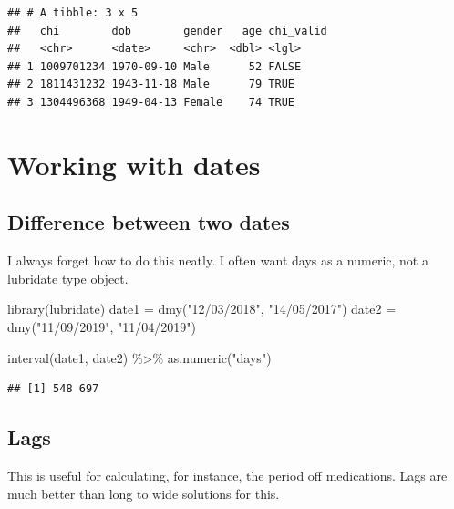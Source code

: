 \documentclass[
]{book}
\newenvironment{Shaded}{\begin{snugshade}}{\end{snugshade}}
\newcommand{\FunctionTok}[1]{\textcolor[rgb]{0.00,0.00,0.00}{#1}}
\newcommand{\NormalTok}[1]{#1}
\newcommand{\OtherTok}[1]{\textcolor[rgb]{0.56,0.35,0.01}{#1}}
\newcommand{\SpecialCharTok}[1]{\textcolor[rgb]{0.00,0.00,0.00}{#1}}
\newcommand{\StringTok}[1]{\textcolor[rgb]{0.31,0.60,0.02}{#1}}
\begin{document}
\begin{verbatim}
## # A tibble: 3 x 5
##   chi        dob        gender   age chi_valid
##   <chr>      <date>     <chr>  <dbl> <lgl>    
## 1 1009701234 1970-09-10 Male      52 FALSE    
## 2 1811431232 1943-11-18 Male      79 TRUE     
## 3 1304496368 1949-04-13 Female    74 TRUE
\end{verbatim}

\hypertarget{working-with-dates}{%
\section{Working with dates}\label{working-with-dates}}

\hypertarget{difference-between-two-dates}{%
\subsection{Difference between two dates}\label{difference-between-two-dates}}

I always forget how to do this neatly.
I often want days as a numeric, not a lubridate type object.

\begin{Shaded}
\begin{Highlighting}[]
\FunctionTok{library}\NormalTok{(lubridate)}
\NormalTok{date1 }\OtherTok{=} \FunctionTok{dmy}\NormalTok{(}\StringTok{"12/03/2018"}\NormalTok{, }\StringTok{"14/05/2017"}\NormalTok{)}
\NormalTok{date2 }\OtherTok{=} \FunctionTok{dmy}\NormalTok{(}\StringTok{"11/09/2019"}\NormalTok{, }\StringTok{"11/04/2019"}\NormalTok{)}

\FunctionTok{interval}\NormalTok{(date1, date2) }\SpecialCharTok{\%\textgreater{}\%} 
  \FunctionTok{as.numeric}\NormalTok{(}\StringTok{"days"}\NormalTok{)}
\end{Highlighting}
\end{Shaded}

\begin{verbatim}
## [1] 548 697
\end{verbatim}

\hypertarget{lags}{%
\subsection{Lags}\label{lags}}

This is useful for calculating, for instance, the period off medications. Lags are much better than long to wide solutions for this.
\end{document}
